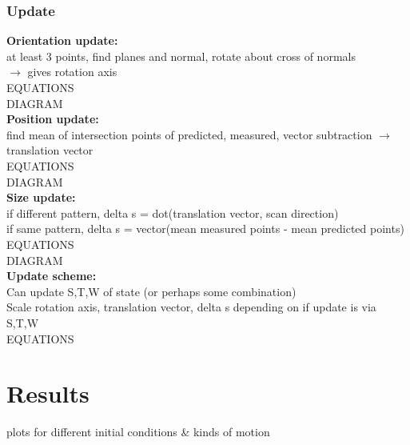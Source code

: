 	\subsubsection{Update}
		\textbf{Orientation update:}\\
			at least 3 points, find planes and normal, rotate about cross of normals\\
			$\rightarrow$ gives rotation axis\\
			EQUATIONS\\
			DIAGRAM\\
			
			
		\textbf{Position update:}\\
			find mean of intersection points of predicted, measured, vector subtraction
			$\rightarrow$ translation vector\\
			EQUATIONS\\
			DIAGRAM\\
			
			
		\textbf{Size update:}\\
			if different pattern, delta s = dot(translation vector, scan direction)\\
			if same pattern, delta s = vector(mean measured points - mean predicted points)\\
			EQUATIONS\\
			DIAGRAM\\
			
			
		\textbf{Update scheme:}\\
			Can update S,T,W of state (or perhaps some combination)\\
			Scale rotation axis, translation vector, delta s depending on if update is via S,T,W\\
			EQUATIONS\\
			
			
\section{Results}
plots for different initial conditions \& kinds of motion
	
